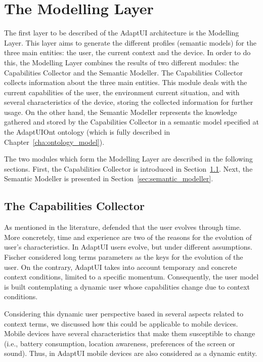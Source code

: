 \section{The Modelling Layer}
\label{sec:modelling_layer}

The first layer to be described of the AdaptUI architecture is the Modelling
Layer. This layer aims to generate the different profiles (semantic models) for
the three main entities: the user, the current context and the device. In order
to do this, the Modelling Layer combines the results of two different modules: 
the Capabilities Collector and the Semantic Modeller. The Capabilities Collector
collects information about the three main entities. This module deals with the
current capabilities of the user, the environment current situation, and with
several characteristics of the device, storing the collected information for
further usage. On the other hand, the Semantic Modeller represents the knowledge
gathered and stored by the Capabilities Collector in a semantic model specified
at the AdaptUIOnt ontology (which is fully described in 
Chapter~\ref{cha:ontology_model}). 

The two modules which form the Modelling Layer are described in the following
sections. First, the Capabilities Collector is introduced in
Section~\ref{sec:capabilities_collector}. Next, the Semantic Modeller is
presented in Section~\ref{sec:semantic_modeller}.


\subsection{The Capabilities Collector}
\label{sec:capabilities_collector}

As mentioned in the literature, \citet{fischer_user_2001} defended that the user
evolves through time. More concretely, time and experience are two of the 
reasons for the  evolution of user's characteristics. In AdaptUI users 
evolve, but under different assumptions. Fischer considered long terms 
parameters as the keys for the evolution of the user. On the contrary, AdaptUI 
takes into account temporary and concrete context conditions, limited to a 
specific momentum. Consequently, the user model is built contemplating a dynamic 
user whose capabilities change due to context conditions.

Considering this dynamic user perspective based in several aspects related to
context terms, we discussed how this could be applicable to mobile devices. 
Mobile devices have several characteristics that make them susceptible to change 
(i.e., battery consumption, location awareness, preferences of the screen or 
sound). Thus, in AdaptUI mobile devices are also considered as a dynamic entity.

